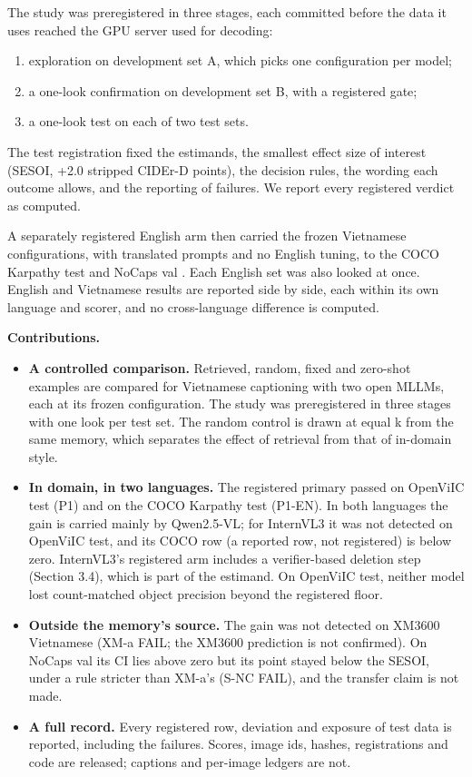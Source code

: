 \documentclass[manuscript,screen]{acmart}
\providecommand{\tightlist}{\setlength{\itemsep}{0pt}\setlength{\parskip}{0pt}}
\begin{document}
The study was preregistered in three stages, each committed before the data it uses reached the GPU
server used for decoding:

\begin{enumerate}
\def\labelenumi{\arabic{enumi}.}
\tightlist
\item
  exploration on development set A, which picks one configuration per model;
\item
  a one-look confirmation on development set B, with a registered gate;
\item
  a one-look test on each of two test sets.
\end{enumerate}

The test registration fixed the estimands, the smallest effect size of interest (SESOI, +2.0
stripped CIDEr-D points), the decision rules, the wording each outcome allows, and the reporting of
failures. We report every registered verdict as computed.

A separately registered English arm then carried the frozen Vietnamese configurations, with
translated prompts and no English tuning, to the COCO Karpathy test
\citep{Lin2014COCO, Karpathy2015Split} and NoCaps val \citep{Agrawal2019NoCaps}. Each English set
was also looked at once. English and Vietnamese results are reported side by side, each within its
own language and scorer, and no cross-language difference is computed.

\textbf{Contributions.}

\begin{itemize}
\tightlist
\item
  \textbf{A controlled comparison.} Retrieved, random, fixed and zero-shot examples are compared for
  Vietnamese captioning with two open MLLMs, each at its frozen configuration. The study was
  preregistered in three stages with one look per test set. The random control is drawn at equal k
  from the same memory, which separates the effect of retrieval from that of in-domain style.
\item
  \textbf{In domain, in two languages.} The registered primary passed on OpenViIC test (P1) and on
  the COCO Karpathy test (P1-EN). In both languages the gain is carried mainly by Qwen2.5-VL; for
  InternVL3 it was not detected on OpenViIC test, and its COCO row (a reported row, not registered)
  is below zero. InternVL3's registered arm includes a verifier-based deletion step (Section 3.4),
  which is part of the estimand. On OpenViIC test, neither model lost count-matched object precision
  beyond the registered floor.
\item
  \textbf{Outside the memory's source.} The gain was not detected on XM3600 Vietnamese (XM-a FAIL;
  the XM3600 prediction is not confirmed). On NoCaps val its CI lies above zero but its point stayed
  below the SESOI, under a rule stricter than XM-a's (S-NC FAIL), and the transfer claim is not
  made.
\item
  \textbf{A full record.} Every registered row, deviation and exposure of test data is reported,
  including the failures. Scores, image ids, hashes, registrations and code are released; captions
  and per-image ledgers are not.
\end{itemize}
\end{document}
